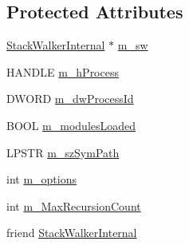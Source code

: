 \subsection*{Protected Attributes}
\begin{DoxyCompactItemize}
\item 
\hyperlink{class_stack_walker_internal}{Stack\-Walker\-Internal} $\ast$ \hyperlink{class_stack_walker_a13524e6f4cd89a8b3a3fd378e3cd3f55}{m\-\_\-sw}
\item 
H\-A\-N\-D\-L\-E \hyperlink{class_stack_walker_a7db892daef90d499084f5e9dd5294ab9}{m\-\_\-h\-Process}
\item 
D\-W\-O\-R\-D \hyperlink{class_stack_walker_adf8bda5434856605a470d42c3db49b38}{m\-\_\-dw\-Process\-Id}
\item 
B\-O\-O\-L \hyperlink{class_stack_walker_a20279e66ed48886369111d47dee4762f}{m\-\_\-modules\-Loaded}
\item 
L\-P\-S\-T\-R \hyperlink{class_stack_walker_aff1b39f2ea31f24b4a693928cdf5549d}{m\-\_\-sz\-Sym\-Path}
\item 
int \hyperlink{class_stack_walker_a3534033da2986b16d5f15f0b4feefa54}{m\-\_\-options}
\item 
int \hyperlink{class_stack_walker_acc7320865d2e5ce2d33536e94208c1f0}{m\-\_\-\-Max\-Recursion\-Count}
\item 
friend \hyperlink{class_stack_walker_ab0d4fa92227f651635d04da2947b873a}{Stack\-Walker\-Internal}
\end{DoxyCompactItemize}


